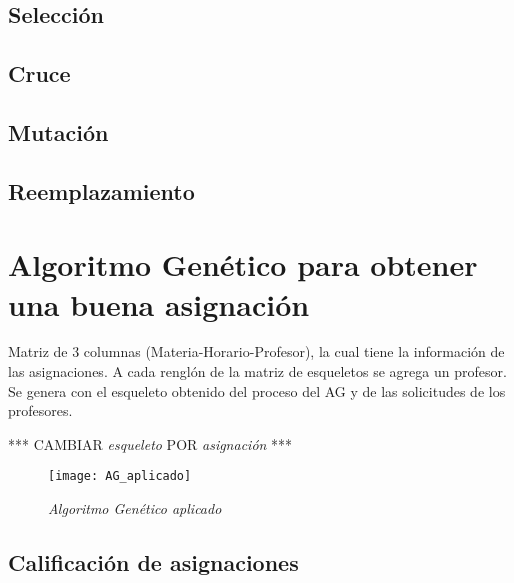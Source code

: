 \subsection{Selección}

\subsection{Cruce}

\subsection{Mutación}

\subsection{Reemplazamiento}


\section{Algoritmo Genético para obtener una buena asignación}

Matriz de 3 columnas (Materia-Horario-Profesor), la cual tiene la información de las asignaciones. A cada renglón de la matriz de esqueletos se agrega un profesor. Se genera con el esqueleto obtenido del proceso del AG y de las solicitudes de los profesores.



*** CAMBIAR \textit{esqueleto} POR \textit{asignación} ***
\begin{figure}[H]
\centering
\texttt{[image: AG\_aplicado]} %
\caption{\textit{Algoritmo Genético aplicado}}
\end{figure}


\subsection{Calificación de asignaciones}
  
%
%
%
%

